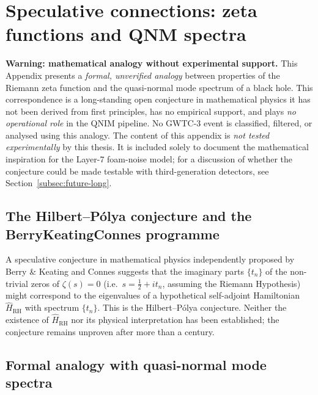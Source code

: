 \documentclass[11pt,a4paper, english]{book}
\theoremstyle{plain}
\theoremstyle{definition}
\numberwithin{equation}{chapter}
\numberwithin{figure}{chapter}
\numberwithin{table}{chapter}
\begin{document}
\chapter{Speculative connections: zeta functions and QNM spectra}
\label{app:bkc-speculative}


\textbf{Warning: mathematical analogy without experimental support.}
This Appendix presents a \emph{formal, unverified analogy} between
properties of the Riemann zeta function and the quasi-normal mode
spectrum of a black hole.  This correspondence is a long-standing open
conjecture in mathematical physics  it has not been derived from
first principles, has no empirical support, and plays
\emph{no operational role} in the QNIM pipeline.  No GWTC-3 event
is classified, filtered, or analysed using this analogy.  The content
of this appendix is \emph{not tested experimentally} by this thesis.
It is included solely to document the mathematical inspiration for the
Layer-7 foam-noise model; for a discussion of whether the conjecture
could be made testable with third-generation detectors,
see Section~\ref{subsec:future-long}.

\section{The Hilbert--P\'{o}lya conjecture and the BerryKeatingConnes programme}
\label{app:bkc-hilbert-polya}

A speculative conjecture in mathematical physics  independently proposed
by Berry \& Keating \citeyear{Berry_Keating_1999} and Connes
\citeyear{Connes_1999}  suggests that the imaginary parts $\{t_n\}$ of the
non-trivial zeros of $\zeta(s) = 0$ (i.e.\, $s = \tfrac{1}{2} + it_n$,
assuming the Riemann Hypothesis) might correspond to the eigenvalues of
a hypothetical self-adjoint Hamiltonian $\hat{H}_\mathrm{RH}$ with
spectrum $\{t_n\}$.  This is the Hilbert--P\'{o}lya conjecture.  Neither the
existence of $\hat{H}_\mathrm{RH}$ nor its physical interpretation has
been established; the conjecture remains unproven after more than
a century.

\section{Formal analogy with quasi-normal mode spectra}
\label{app:bkc-qnm-analogy}
\end{document}
